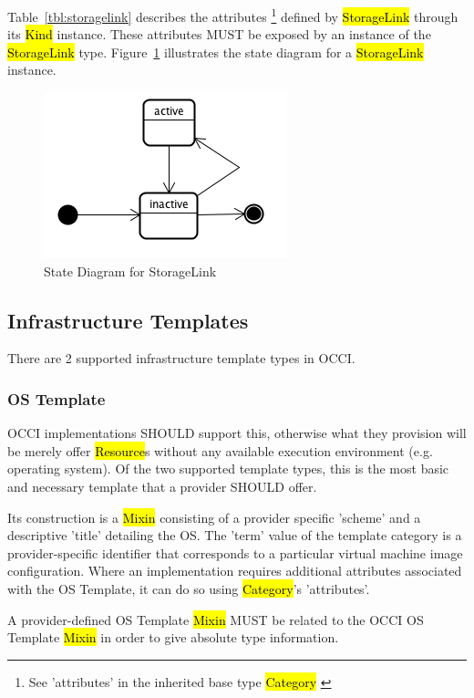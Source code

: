 \documentclass[10pt,a4paper]{article}
\begin{document}
Table~\ref{tbl:storagelink} describes the attributes \footnote{See ’attributes’ in the inherited 
base type \hl{Category}  \cite{occi:core}} 
defined by \hl{StorageLink} through its \hl{Kind} instance. These attributes
MUST be exposed by an instance of the \hl{StorageLink} type. 
Figure~\ref{fig:storagelink_state} illustrates the state diagram for a \hl{StorageLink} instance.

\begin{figure}[!h]
	\centering
	\includegraphics[scale=0.4]{figs/infra-link-state.png}
	\caption{State Diagram for StorageLink}
	\label{fig:storagelink_state}
\end{figure}

\subsection{Infrastructure Templates}
There are 2 supported infrastructure template types in OCCI.

\subsubsection{OS Template}
OCCI implementations SHOULD support this, otherwise what they provision will be merely offer \hl
{Resource}s without any available execution environment (e.g. operating system). Of the two 
supported template types, this is the most basic and necessary template that a provider SHOULD offer. 

Its construction is a \hl{Mixin} consisting of a provider specific 'scheme' and a descriptive 'title' 
detailing the OS. The 'term' value of the template category is a provider-specific identifier that 
corresponds to a particular virtual machine image configuration. Where an implementation requires 
additional attributes associated with the OS Template, it can do so using \hl{Category}'s 'attributes'.

A provider-defined OS Template \hl{Mixin} MUST be related to 
the OCCI OS Template \hl{Mixin} in order to give absolute type information. 
\end{document}
